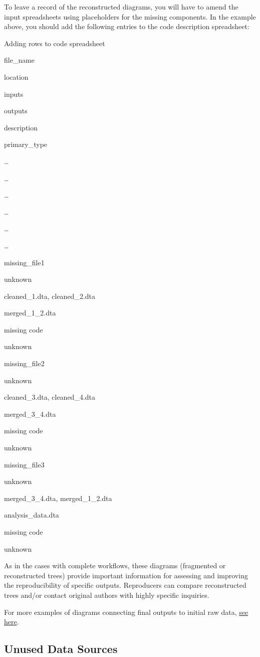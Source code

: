 \documentclass[]{book}
\begin{document}
To leave a record of the reconstructed diagrams, you will have to amend the input spreadsheets using placeholders for the missing components. In the example above, you should add the following entries to the code description spreadsheet:

\label{tab:adding-rows}Adding rows to code spreadsheet

file\_name

location

inputs

outputs

description

primary\_type

\ldots{}

\ldots{}

\ldots{}

\ldots{}

\ldots{}

\ldots{}

missing\_file1

unknown

cleaned\_1.dta, cleaned\_2.dta

merged\_1\_2.dta

missing code

unknown

missing\_file2

unknown

cleaned\_3.dta, cleaned\_4.dta

merged\_3\_4.dta

missing code

unknown

missing\_file3

unknown

merged\_3\_4.dta, merged\_1\_2.dta

analysis\_data.dta

missing code

unknown

As in the cases with complete workflows, these diagrams (fragmented or reconstructed trees) provide important information for assessing and improving the reproducibility of specific outputs. Reproducers can compare reconstructed trees and/or contact original authors with highly specific inquiries.

For more examples of diagrams connecting final outputs to initial raw data, \protect\hyperlink{additional-diagrams}{see here}.

\hypertarget{unused-data-sources}{%
\subsection{Unused Data Sources}\label{unused-data-sources}}
\end{document}
